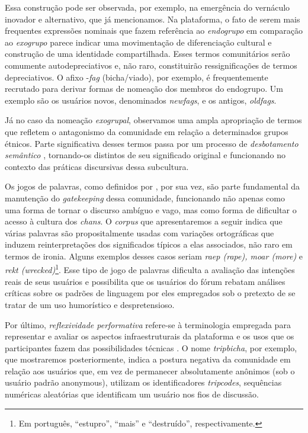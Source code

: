 \documentclass[portuguese]{textolivre}
\begin{document}
Essa construção pode ser observada, por exemplo, na emergência do vernáculo inovador e alternativo, que já mencionamos. Na plataforma, o fato de serem mais frequentes expressões nominais que fazem referência ao \emph{endogrupo} em comparação ao \emph{exogrupo} \cite{peeters2021vernacular} parece indicar uma movimentação de diferenciação cultural e construção de uma identidade compartilhada. Esses termos comunitários serão comumente autodepreciativos e, não raro, constituirão ressignificações de termos depreciativos. O afixo -\emph{fag} (bicha/viado), por exemplo, é frequentemente recrutado para derivar formas de nomeação dos membros do endogrupo. Um exemplo são os usuários novos, denominados \emph{newfags}, e os antigos, \emph{oldfags}. 

Já no caso da nomeação \emph{exogrupal}, observamos uma ampla apropriação de termos que refletem o antagonismo da comunidade em relação a determinados grupos étnicos. Parte significativa desses termos passa por um processo de \emph{desbotamento semântico} \cite{sweetser1988grammaticalization}, tornando-os distintos de seu significado original e funcionando no contexto das práticas discursivas dessa subcultura. 

Os jogos de palavras, como definidos por \textcite{peeters2021vernacular}, por sua vez, são parte fundamental da manutenção do \emph{gatekeeping} dessa comunidade, funcionando não apenas como uma forma de tornar o discurso ambíguo e vago, mas como forma de dificultar o acesso à cultura dos \emph{chans}. O \emph{corpus} que apresentaremos a seguir indica que várias palavras são propositalmente usadas com variações ortográficas que induzem reinterpretações dos significados típicos a elas associados, não raro em termos de ironia. Alguns exemplos desses casos seriam \emph{raep (rape), moar (more)} e \emph{rekt (wrecked)}\footnote{Em português, “estupro”, “mais” e “destruído”, respectivamente.}. Esse tipo de jogo de palavras dificulta a avaliação das intenções reais de seus usuários e possibilita que os usuários do fórum rebatam análises críticas sobre os padrões de linguagem por eles empregados sob o pretexto de se tratar de um uso humorístico e despretensioso. 

Por último, \emph{reflexividade performativa} refere-se à terminologia empregada para representar e avaliar os aspectos infraestruturais da plataforma e os usos que os participantes fazem das possibilidades técnicas \cite[p. 10]{peeters2021vernacular}. O nome \emph{tripbicha}, por exemplo, que mostraremos posteriormente, indica a postura negativa da comunidade em relação aos usuários que, em vez de permanecer absolutamente anônimos (sob o usuário padrão anonymous), utilizam os identificadores \emph{tripcodes}, sequências numéricas aleatórias que identificam um usuário nos fios de discussão.
\end{document}
